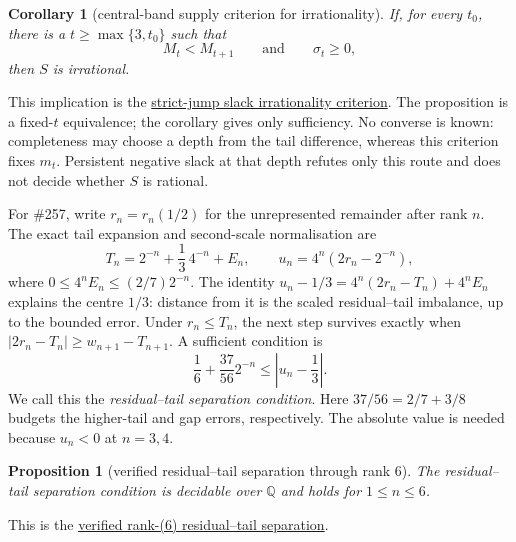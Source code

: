 \documentclass[11pt]{article}
\newcommand{\commit}{bb4e24651b37cd096d3749ef299c3317930b3a3b}
\newcommand{\repobase}{https://github.com/wcook04/plectis-lean-erdos249-257/blob/\commit}
\newcommand{\PK}{Erdos249257}
\newcommand{\lword}[4]{\href{\repobase/\PK/#1\#L#2}{#4}}
\newtheorem{proposition}[theorem]{Proposition}
\newtheorem{corollary}[theorem]{Corollary}
\theoremstyle{definition}
\theoremstyle{remark}
\newcommand{\Q}{\mathbb{Q}}
\begin{document}
\begin{corollary}[central-band supply criterion for irrationality]
\label{res:slackcriterion}
If, for every $t_0$, there is a $t\ge\max\{3,t_0\}$ such that
\[
 M_t<M_{t+1}\qquad\text{and}\qquad \sigma_t\ge0,
\]
then $S$ is irrational.
\end{corollary}
\noindent This implication is the
\lword{DiagonalFreshLossBridge.lean}{2932}{irrational_totientSeries_of_canonicalAdjacentSuffixJumpSlackSupply}{strict-jump slack irrationality criterion}.
The proposition is a fixed-\(t\) equivalence; the corollary gives only
sufficiency.  No converse is known: completeness may choose a depth from the
tail difference, whereas this criterion fixes \(m_t\).  Persistent negative
slack at that depth refutes only this route and does not decide whether \(S\)
is rational.

For \#257, write \(r_n=r_n(1/2)\) for the unrepresented remainder after rank
\(n\).  The exact tail expansion and second-scale normalisation are
\[
 T_n=2^{-n}+\frac13\,4^{-n}+E_n,
 \qquad u_n=4^n(2r_n-2^{-n}),
\]
where \(0\le4^nE_n\le(2/7)2^{-n}\).  The identity
\(u_n-1/3=4^n(2r_n-T_n)+4^nE_n\) explains the centre \(1/3\): distance from it
is the scaled residual--tail imbalance, up to the bounded error.  Under
\(r_n\le T_n\), the next step survives exactly when
\(\lvert2r_n-T_n\rvert\ge w_{n+1}-T_{n+1}\).  A sufficient condition is
\[
  \frac16+\frac{37}{56}2^{-n}\le \left|u_n-\frac13\right|.
\]
We call this the \emph{residual--tail separation condition}.  Here
\(37/56=2/7+3/8\) budgets the higher-tail and gap errors, respectively.
The absolute value is needed because \(u_n<0\) at \(n=3,4\).

\begin{proposition}[verified residual--tail separation through rank \(6\)]\label{res:secondfrontier}
The residual--tail separation condition is decidable over $\Q$ and holds for
$1\le n\le6$.
\end{proposition}
\noindent This is the
\lword{GreedyAchievementSet.lean}{2973}{halfSecondChannelSeparatedRat_of_pos_le_six}{verified rank-(6) residual--tail separation}.
\end{document}
